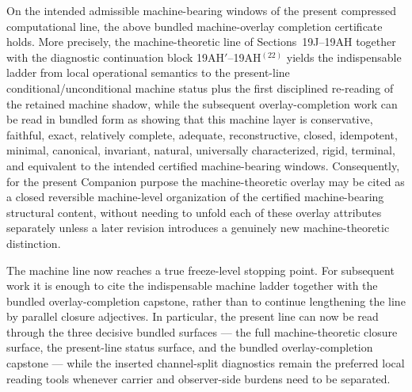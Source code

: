 \begin{proposition}
On the intended admissible machine-bearing windows of the present compressed computational line, the above bundled machine-overlay completion certificate holds. More precisely, the machine-theoretic line of Sections~19J--19AH together with the diagnostic continuation block 19AH$\prime$--19AH$^{(22)}$ yields the indispensable ladder from local operational semantics to the present-line conditional/unconditional machine status plus the first disciplined re-reading of the retained machine shadow, while the subsequent overlay-completion work can be read in bundled form as showing that this machine layer is conservative, faithful, exact, relatively complete, adequate, reconstructive, closed, idempotent, minimal, canonical, invariant, natural, universally characterized, rigid, terminal, and equivalent to the intended certified machine-bearing windows. Consequently, for the present Companion purpose the machine-theoretic overlay may be cited as a closed reversible machine-level organization of the certified machine-bearing structural content, without needing to unfold each of these overlay attributes separately unless a later revision introduces a genuinely new machine-theoretic distinction.
\end{proposition}

\begin{corollary}
The machine line now reaches a true freeze-level stopping point. For subsequent work it is enough to cite the indispensable machine ladder together with the bundled overlay-completion capstone, rather than to continue lengthening the line by parallel closure adjectives. In particular, the present line can now be read through the three decisive bundled surfaces --- the full machine-theoretic closure surface, the present-line status surface, and the bundled overlay-completion capstone --- while the inserted channel-split diagnostics remain the preferred local reading tools whenever carrier and observer-side burdens need to be separated.
\end{corollary}

